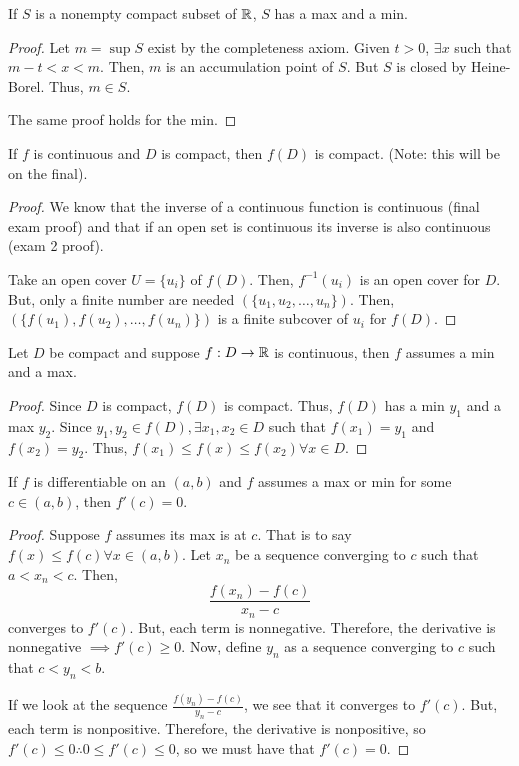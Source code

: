\begin{theorem}
    If $S$ is a nonempty compact subset of $\mathbb{R}$, $S$ has a max and a min.
\end{theorem}
\begin{proof}
    Let $m = \sup S$ exist by the completeness axiom. Given $t > 0$, $\exists x$ such that $m - t < x < m$. Then, $m$ is an accumulation point of $S$. But $S$ is closed by Heine-Borel. Thus, $m \in S$.

    The same proof holds for the min.
\end{proof}

\begin{theorem}
    If $f$ is continuous and $D$ is compact, then $f(D)$ is compact. (Note: this will be on the final).
\end{theorem}
\begin{proof}
    We know that the inverse of a continuous function is continuous (final exam proof) and that if an open set is continuous its inverse is also continuous (exam 2 proof).
    
    Take an open cover $U = \{u_i\}$ of $f(D)$. Then, $f^{-1}(u_i)$ is an open cover for $D$. But, only a finite number are needed $(\{u_1, u_2, \ldots, u_n\})$. Then, $(\{f(u_1), f(u_2), \ldots, f(u_n)\})$ is a finite subcover of $u_i$ for $f(D)$.
\end{proof}

\begin{theorem}
    Let $D$ be compact and suppose $f: D \to \mathbb{R}$ is continuous, then $f$ assumes a min and a max.
\end{theorem}
\begin{proof}
    Since $D$ is compact, $f(D)$ is compact. Thus, $f(D)$ has a min $y_1$ and a max $y_2$. Since $y_1, y_2 \in f(D), \exists x_1, x_2 \in D$ such that $f(x_1) = y_1$ and $f(x_2) = y_2$. Thus, $f(x_1) \leq f(x) \leq f(x_2) \forall x \in D$.
\end{proof}

\begin{theorem}
    If $f$ is differentiable on an $(a, b)$ and $f$ assumes a max or min for some $c \in (a, b)$, then $f'(c) = 0$.
\end{theorem}
\begin{proof}
    Suppose $f$ assumes its max is at $c$. That is to say $f(x) \leq f(c) \forall x \in (a, b)$. Let $x_n$ be a sequence converging to $c$ such that $a < x_n < c$. Then, $$\frac{f(x_n) - f(c)}{x_n - c}$$ converges to $f'(c)$. But, each term is nonnegative. Therefore, the derivative is nonnegative $\implies f'(c) \geq 0$. Now, define $y_n$ as a sequence converging to $c$ such that $c < y_n < b$.

    If we look at the sequence $\frac{f(y_n) - f(c)}{y_n - c}$, we see that it converges to $f'(c)$. But, each term is nonpositive. Therefore, the derivative is nonpositive, so $f'(c) \leq 0 \therefore 0 \leq f'(c) \leq 0$, so we must have that $f'(c) = 0$.
\end{proof}